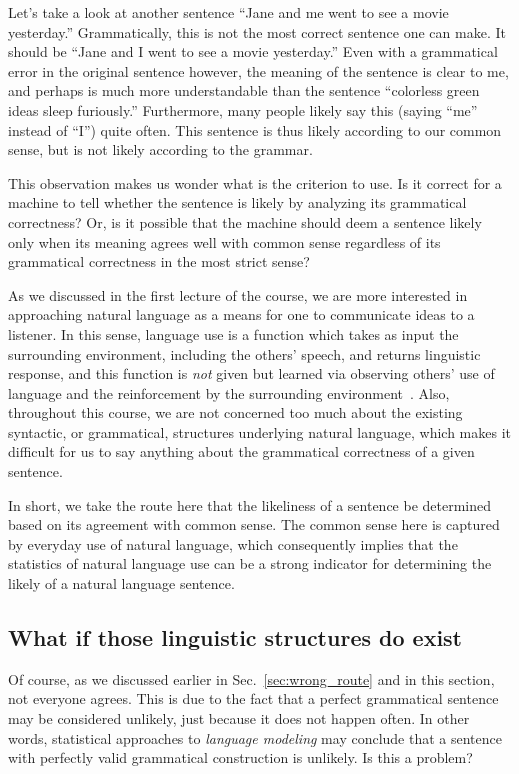 \documentclass{report}
\newcommand{\alert}[1]{\textcolor{red}{#1}}
\begin{document}
Let's take a look at another sentence ``Jane and me went to see a movie
yesterday.'' Grammatically, this is not the most correct sentence one can make.
It should be ``Jane and I went to see a movie yesterday.'' Even with a
grammatical error in the original sentence however, the meaning of the sentence
is clear to me, and perhaps is much more understandable than the sentence
``colorless green ideas sleep furiously.'' Furthermore, many people likely say
this (saying ``me'' instead of ``I'') quite often. This sentence is thus likely
according to our common sense, but is not likely according to the grammar.

This observation makes us wonder what is the criterion to use. Is it correct for
a machine to tell whether the sentence is likely by analyzing its grammatical
correctness? Or, is it possible that the machine should deem a sentence likely
only when its meaning agrees well with common sense regardless of its
grammatical correctness in the most strict sense?

As we discussed in the first lecture of the course, we are more interested in
approaching natural language as a means for one to communicate ideas to a
listener. In this sense, language use is a function which takes as input the
surrounding environment, including the others' speech, and returns linguistic
response, and this function is {\em not} given but learned via observing others'
use of language 
and the
reinforcement by the surrounding environment~\cite{skinner2014verbal}. Also,
throughout this course, we are not concerned too much about the existing
syntactic, or grammatical, structures underlying natural language, which makes
it difficult for us to say anything about the grammatical correctness of a given
sentence.

In short, we take the route here that the likeliness of a sentence be determined
based on its agreement with common sense. The common sense here is captured by
everyday use of natural language, which consequently implies that the statistics
of natural language use can be a strong indicator for determining the likely of
a natural language sentence. 

\subsection{What if those linguistic structures do exist}
\label{sec:linguistic_lm}

Of course, as we discussed earlier in Sec.~\ref{sec:wrong_route} and in this
section, not everyone agrees.  This is due to the fact that a perfect
grammatical sentence may be considered unlikely, just because it does not happen
often. In other words, statistical approaches to {\em language modeling} may
conclude that a sentence with perfectly valid grammatical construction is
unlikely. Is this a problem? 
\end{document}
